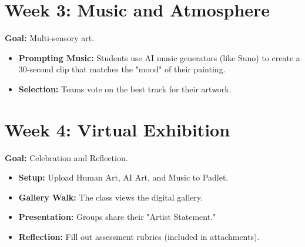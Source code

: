 \documentclass[11pt, a4paper]{article}
\begin{document}
\section{Week 3: Music and Atmosphere}
\textbf{Goal:} Multi-sensory art.
\begin{itemize}
    \item \textbf{Prompting Music:} Students use AI music generators (like Suno) to create a 30-second clip that matches the "mood" of their painting.
    \item \textbf{Selection:} Teams vote on the best track for their artwork.
\end{itemize}

\section{Week 4: Virtual Exhibition}
\textbf{Goal:} Celebration and Reflection.
\begin{itemize}
    \item \textbf{Setup:} Upload Human Art, AI Art, and Music to Padlet.
    \item \textbf{Gallery Walk:} The class views the digital gallery.
    \item \textbf{Presentation:} Groups share their "Artist Statement."
    \item \textbf{Reflection:} Fill out assessment rubrics (included in attachments).
\end{itemize}
\end{document}
